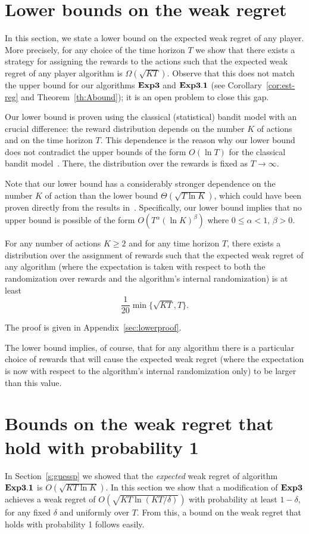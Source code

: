 \documentclass[12pt]{article}
\newcommand{\Aest}{{\bf Exp3}}
\newcommand{\Abound}{{\bf Exp3.1}}
\begin{document}
\section{Lower bounds on the weak regret}
\label{s:lower}
%
In this section, we state a lower bound on the expected weak regret of any player.
More precisely, for any choice of the time horizon $T$ we show that there exists
a strategy for assigning the rewards to the actions such that the expected weak
regret of any player algorithm is $\Omega(\sqrt{KT})$.
Observe that this does not match the upper bound for our algorithms $\Aest$
and $\Abound$ (see Corollary~\ref{cor:est-reg} and
Theorem~\ref{th:Abound}); it is an open problem to close this gap. 

Our lower bound is proven using the classical (statistical) bandit
model with an crucial difference: the reward distribution depends
on the number $K$ of actions and on the time horizon $T$. 
This dependence is the reason why our lower bound does not contradict
the upper bounds of the form $O(\ln T)$ for the classical bandit
model~\cite{LaiRo85}. There, the distribution over the rewards is fixed
as $T \to \infty$.

Note that our lower bound has a considerably stronger dependence on the
number $K$ of action than the lower bound $\Theta(\sqrt{T \ln K})$,
which could have been proven directly from the results
in~\cite{CesabianchiFrHeHaScWa97,FreundSc97}.
Specifically, our lower bound implies that no upper bound is possible
of the form $O(T^{\alpha}(\ln K)^{\beta})$ where $0 \leq \alpha < 1$, $\beta>0$.
%
\begin{theorem} \label{thm:lower-bound}
For any number of actions $K \geq 2$ and for any time horizon $T$, there
exists a distribution over the assignment of rewards such that the expected
weak regret of any algorithm (where the expectation is taken with respect to both the
randomization over rewards and the algorithm's internal randomization) is at least
\[
        \frac{1}{20} \min\{\sqrt{KT},T\}.
\]
\end{theorem}
%
The proof is given in Appendix~\ref{sec:lowerproof}.

The lower bound implies, of course, that for any algorithm there is a particular
choice of rewards that will cause the expected weak regret (where the expectation
is now with respect to the algorithm's internal randomization only) to be larger than this
value. 

\section{Bounds on the weak regret that hold with probability 1}
\label{sec:hp}
In Section~\ref{s:guessp} we showed that the {\em expected} weak regret
of algorithm $\Abound$ is $O(\sqrt{KT\ln K})$.
In this section we show that a modification of $\Aest$ achieves
a weak regret of $O(\sqrt{KT\ln(KT/\delta)})$ with probability at least
$1-\delta$, for any fixed $\delta$ and uniformly over $T$. From this, a bound
on the weak regret that holds with probability 1 follows easily.
\end{document}
